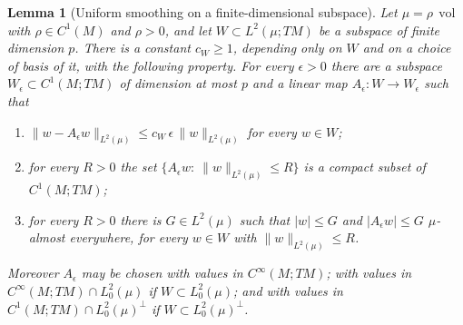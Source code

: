 \documentclass[11pt,reqno]{amsart}
\theoremstyle{plain}
\newtheorem{lem}[thm]{Lemma}
\theoremstyle{definition}
\DeclareMathOperator{\vol}{vol}
\begin{document}
\begin{lem}[Uniform smoothing on a finite-dimensional subspace]
\label{lem:uniform.smoothing}
    Let \( \mu=\rho\,\vol \) with \( \rho\in C^1(M) \) and \( \rho>0 \), and let \( W\subset L^2(\mu;TM) \) be a subspace of finite dimension \( p \).
    There is a constant \( c_W\ge1 \), depending only on \( W \) and on a choice of basis of it, with the following property.
    For every \( \epsilon>0 \) there are a subspace \( W_\epsilon\subset C^1(M;TM) \) of dimension at most \( p \) and a linear map \( A_\epsilon:W\to W_\epsilon \) such that
    \begin{enumerate}
        \item\label{item:us.approx}
            \( \lVert w-A_\epsilon w\rVert_{L^2(\mu)}\le c_W\,\epsilon\,\lVert w\rVert_{L^2(\mu)} \) for every \( w\in W \);
        \item\label{item:us.compact}
            for every \( R>0 \) the set \( \big\{A_\epsilon w:\ \lVert w\rVert_{L^2(\mu)}\le R\big\} \) is a compact subset of \( C^1(M;TM) \);
        \item\label{item:us.dominated}
            for every \( R>0 \) there is \( G\in L^2(\mu) \) such that \( \lvert w\rvert\le G \) and \( \lvert A_\epsilon w\rvert\le G \) \( \mu \)-almost everywhere, for every \( w\in W \) with \( \lVert w\rVert_{L^2(\mu)}\le R \).
    \end{enumerate}
    Moreover \( A_\epsilon \) may be chosen with values in \( C^\infty(M;TM) \); with values in \( C^\infty(M;TM)\cap L^2_0(\mu) \) if \( W\subset L^2_0(\mu) \); and with values in \( C^1(M;TM)\cap L^2_0(\mu)^\perp \) if \( W\subset L^2_0(\mu)^\perp \).
\end{lem}
\end{document}
